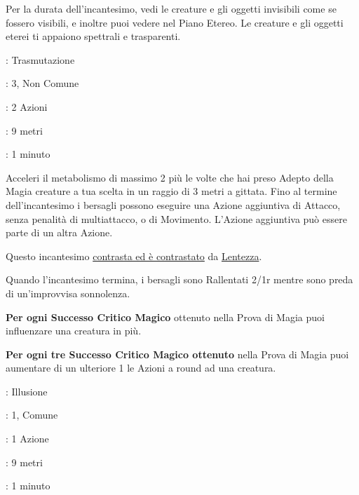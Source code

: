\begin{multicols}{2}
Per la durata dell'incantesimo, vedi le creature e gli oggetti invisibili come se fossero visibili, e inoltre puoi vedere nel Piano Etereo. Le creature e gli oggetti eterei ti appaiono spettrali e trasparenti.

\noindent\colorbox{OBSSgold!10}{
\begin{minipage}{0.95\linewidth}
\begin{description}[noitemsep, topsep=0pt, parsep=0pt, partopsep=0pt, leftmargin=0cm, labelwidth=1.3cm]
	\item[\textbf{Lista}]: Trasmutazione
	\item[\textbf{Livello}]: 3, Non Comune
	\item[\textbf{Lancio}]: 2 Azioni
	\item[\textbf{Gittata}]: 9 metri
	\item[\textbf{Durata}]: 1 minuto
\end{description}
\end{minipage}}\smallskip

Acceleri il metabolismo di massimo 2 più le volte che hai preso Adepto della Magia creature a tua scelta in un raggio di 3 metri a gittata. Fino al termine dell'incantesimo i bersagli possono eseguire una Azione aggiuntiva di Attacco, senza penalità di multiattacco, o di Movimento. L'Azione aggiuntiva può essere parte di un altra Azione.

Questo incantesimo \hyperlink{contrastareincantesimi}{contrasta ed è contrastato} da \hyperlink{lentezza}{Lentezza}.

Quando l'incantesimo termina, i bersagli sono Rallentati 2/1r mentre sono preda di un'improvvisa sonnolenza.

\textbf{Per ogni Successo Critico Magico} ottenuto nella Prova di Magia puoi influenzare una creatura in più.

\textbf{Per ogni tre Successo Critico Magico ottenuto} nella Prova di Magia puoi aumentare di un ulteriore 1 le Azioni a round ad una creatura.

\noindent\colorbox{OBSSgold!10}{
\begin{minipage}{0.95\linewidth}
\begin{description}[noitemsep, topsep=0pt, parsep=0pt, partopsep=0pt, leftmargin=0cm, labelwidth=1.3cm]
	\item[\textbf{Lista}]: Illusione
	\item[\textbf{Livello}]: 1, Comune
	\item[\textbf{Lancio}]: 1 Azione
	\item[\textbf{Gittata}]: 9 metri
	\item[\textbf{Durata}]: 1 minuto
\end{description}
\end{minipage}}\smallskip


\end{multicols}
